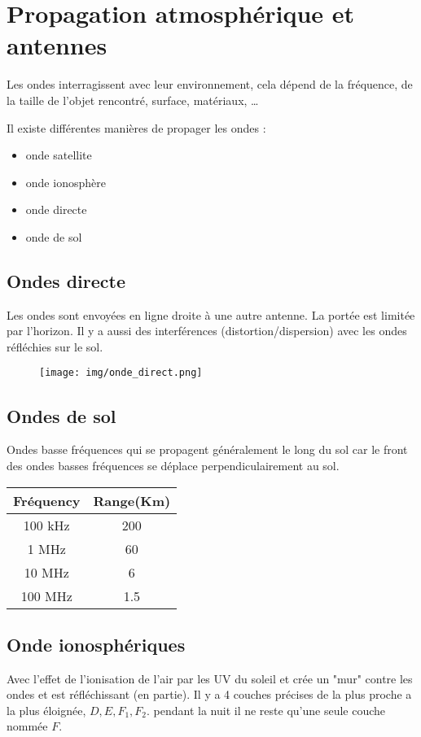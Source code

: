 \section{Propagation atmosphérique et antennes}
	Les ondes interragissent avec leur environnement, cela dépend de la fréquence, de la taille de l'objet rencontré, surface, matériaux, \dots
	
	Il existe différentes manières de propager les ondes :
	\begin{itemize}
		\item onde satellite
		\item onde ionosphère
		\item onde directe
		\item onde de sol
	\end{itemize}
	
	
	\subsection{Ondes directe}
		Les ondes sont envoyées en ligne droite à une autre antenne. La portée est limitée par l'horizon. Il y a aussi des interférences (distortion/dispersion) avec les ondes réfléchies sur le sol.
		
		\begin{figure}[H]
			\centering
			\texttt{[image: img/onde\_direct.png]}
		\end{figure}
	
	\subsection{Ondes de sol}
		Ondes basse fréquences qui se propagent généralement le long du sol car le front des ondes basses fréquences se déplace perpendiculairement au sol.
		\begin{center}
			\begin{tabular}{|c|c|}
			\hline
			Fréquency & Range(Km)\\
			\hline
			100 kHz & 200\\
			1 MHz & 60\\
			10 MHz & 6\\
			100 MHz & 1.5\\
			\hline
		
		\end{tabular}
		\end{center}
		
	\subsection{Onde ionosphériques}
		Avec l'effet de l'ionisation de l'air par les UV du soleil et crée un "mur" contre les ondes et est réfléchissant (en partie).
		Il y a 4 couches précises de la plus proche a la plus éloignée, $D,E,F_1,F_2$. pendant la nuit il ne reste qu'une seule couche nommée $F$.
		
